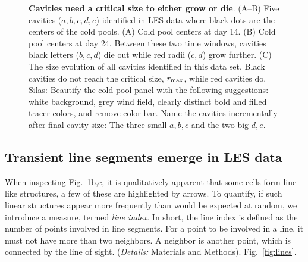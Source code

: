 \documentclass[reprint,amsmath,amssymb]{revtex4-1}
\begin{document}
\begin{figure}
\caption{{\bf Cavities need a critical size to either grow or die}. (A--B) Five cavities ($a,b,c,d,e$) identified in LES data where black dots are the centers of the cold pools. (A) Cold pool centers at day 14. (B) Cold pool centers at day 24. Between these two time windows, cavities black letters ($b,c,d$) die out while red radii ($c,d$) grow further. (C) The size evolution of all cavities identified in this data set. Black cavities do not reach the critical size, $r_{\textnormal{max}}$, while red cavities do. {\color{red} Silas: Beautify the cold pool panel with the following suggestions: white background, grey wind field, clearly distinct bold and filled tracer colors, and remove color bar. Name the cavities incrementally after final cavity size: The three small $a,b,c$ and the two big $d,e$.}}
\label{fig:cavities}
\end{figure}

\subsection{Transient line segments emerge in LES data}
When inspecting Fig.~\ref{fig:cavities}b,c, it is qualitatively apparent that some cells form line-like structures, a few of these are highlighted by arrows. 
To quantify, if such linear structures appear more frequently than would be expected at random, we introduce a measure, termed {\it line index}. 
In short, the line index is defined as the number of points involved in line segments. 
For a point to be involved in a line, it must not have more than two neighbors. 
A neighbor is another point, which is connected by the line of sight. ({\it Details:} Materials and Methods).
Fig.~\ref{fig:lines}.
\end{document}
